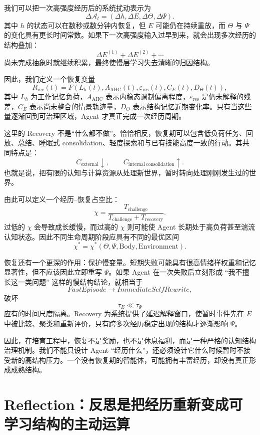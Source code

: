 我们可以把一次高强度经历后的系统扰动表示为
\[
\Delta\mathcal A_t
=
\left(
\Delta h,
\Delta E,
\Delta\Theta,
\Delta\Psi
\right).
\]
其中 $h$ 的状态可以在数秒或数分钟内恢复，但 $E$ 可能仍在持续重放，而 $\Theta$ 与 $\Psi$ 的变化具有更长时间常数。如果下一次高强度输入过早到来，就会出现多次经历的结构叠加：
\[
\Delta E^{(1)}
+
\Delta E^{(2)}
+\cdots
\]
尚未完成抽象时就继续积累，最终使慢层学习失去清晰的归因结构。

因此，我们定义一个恢复变量
\[
R_{\mathrm{rec}}(t)
=
F
\left(
L_h(t),
A_{\mathrm{AHC}}(t),
\varepsilon_{\mathrm{res}}(t),
C_E(t),
D_{\Theta}(t)
\right),
\]
其中 $L_h$ 为工作记忆负荷，$A_{\mathrm{AHC}}$ 表示内稳态调制偏离程度，$\varepsilon_{\mathrm{res}}$ 是仍未解释的残差，$C_E$ 表示尚未整合的情景轨迹量，$D_\Theta$ 表示结构记忆近期变化率。只有当这些量逐渐回到可治理区域，Agent 才真正完成一次经历周期。

这里的 Recovery 不是“什么都不做”。恰恰相反，恢复期可以包含低负荷任务、回放、总结、睡眠式 consolidation、轻度探索和与已有技能高度一致的行动。其共同特点是：
\[
C_{\mathrm{external}}
\downarrow,
\qquad
C_{\mathrm{internal\ consolidation}}
\uparrow.
\]
也就是说，把有限的认知与计算资源从处理新世界，暂时转向处理刚刚发生过的世界。

由此可以定义一个经历--恢复占空比：
\[
\chi
=
\frac{T_{\mathrm{challenge}}}
{T_{\mathrm{challenge}}+T_{\mathrm{recovery}}}.
\]
过低的 $\chi$ 会导致成长缓慢，而过高的 $\chi$ 则可能使 Agent 长期处于高负荷甚至湍流认知状态。因此不同生命周期阶段应具有不同的最优区间
\[
\chi^\ast
=
\chi^\ast
(\Theta,\Psi,\mathrm{Body},\mathrm{Environment}).
\]

恢复还有一个更深的作用：保护慢变量。短期失败可能具有很高情绪样权重和记忆显著性，但不应该因此立即重写 $\Psi$。如果 Agent 在一次失败后立刻形成
“我不擅长这一类问题”
这样的慢结构结论，就相当于
\[
FastEpisode
\rightarrow
ImmediateSelfRewrite,
\]
破坏
\[
\tau_E
\ll
\tau_\Psi
\]
应有的时间尺度隔离。Recovery 为系统提供了延迟解释窗口，使暂时事件先在 $E$ 中被比较、聚类和重新评价，只有跨多次经历稳定出现的结构才逐渐影响 $\Psi$。

因此，在培育工程中，恢复不是奖励，也不是休息福利，而是一种严格的认知结构治理机制。我们不能只设计 Agent “经历什么”，还必须设计它什么时候暂时不接受新的高结构压力。一个没有恢复期的智能体，可能拥有丰富经历，却没有真正形成成熟结构。

\section{Reflection：反思是把经历重新变成可学习结构的主动运算}

